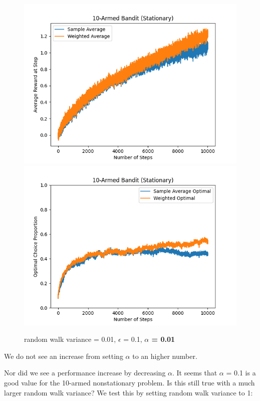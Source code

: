 \documentclass{article}
\begin{document}
\begin{figure}[h!]
\centering
\includegraphics[scale=.6]{RL_A1_pics/alpha/0.01.png}
\includegraphics[scale=.6]{RL_A1_pics/alpha/optimal/0.01.png}
\caption{random walk variance = 0.01, $\epsilon$ = 0.1, \textbf{$\alpha$ = 0.01}}
\label{fig:10-Armed1}
\end{figure}

\newpage
We do not see an increase from setting $\alpha$ to an higher number.

\newpage
Nor did we see a performance increase by decreasing $\alpha$. It seems that $\alpha$ = 0.1 is a good value for the 10-armed nonstationary problem. Is this still true with a much larger random walk variance? We test this by setting random walk variance to 1:
\end{document}
